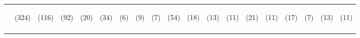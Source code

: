 \begin{tabular}{lcccccccccccccccccc}
 & \begin{footnotesize}(324)\end{footnotesize} & \begin{footnotesize}(116)\end{footnotesize} & \begin{footnotesize}(92)\end{footnotesize} & \begin{footnotesize}(20)\end{footnotesize} & \begin{footnotesize}(34)\end{footnotesize} & \begin{footnotesize}(6)\end{footnotesize} & \begin{footnotesize}(9)\end{footnotesize} & \begin{footnotesize}(7)\end{footnotesize} & \begin{footnotesize}(54)\end{footnotesize} & \begin{footnotesize}(18)\end{footnotesize} & \begin{footnotesize}(13)\end{footnotesize} & \begin{footnotesize}(11)\end{footnotesize} & \begin{footnotesize}(21)\end{footnotesize} & \begin{footnotesize}(11)\end{footnotesize} & \begin{footnotesize}(17)\end{footnotesize} & \begin{footnotesize}(7)\end{footnotesize} & \begin{footnotesize}(13)\end{footnotesize} & \begin{footnotesize}(11)\end{footnotesize}\\
\noalign{\smallskip}\hline\end{tabular}\\
